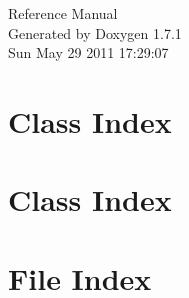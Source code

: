 \documentclass[a4paper]{book}
\begin{document}
\hypersetup{pageanchor=false}
\begin{titlepage}
\vspace*{7cm}
\begin{center}
{\Large Reference Manual}\\
\vspace*{1cm}
{\large Generated by Doxygen 1.7.1}\\
\vspace*{0.5cm}
{\small Sun May 29 2011 17:29:07}\\
\end{center}
\end{titlepage}
\clearemptydoublepage
{}
\tableofcontents
\clearemptydoublepage
{}
\hypersetup{pageanchor=true}
\chapter{Class Index}

\chapter{Class Index}

\chapter{File Index}

\end{document}
